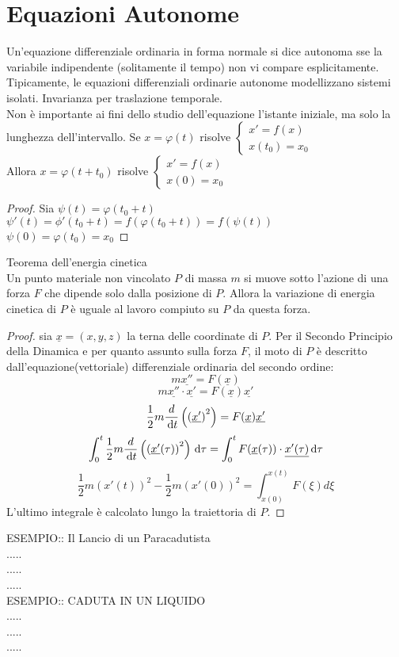 \section{Equazioni Autonome}
Un'equazione differenziale ordinaria in forma normale si dice autonoma sse la variabile indipendente (solitamente il tempo) non vi compare esplicitamente.
\observation
Tipicamente, le equazioni differenziali ordinarie autonome modellizzano sistemi isolati.
\observation Invarianza per traslazione temporale.\\
Non è importante ai fini dello studio dell'equazione l'istante iniziale, ma solo la lunghezza dell'intervallo.
Se  $x=\varphi(t)$ risolve $\left\{ \begin{matrix}  x' = f(x)\\x(t_0)=x_0 \end{matrix} \right.$\\
Allora $x=\varphi(t+t_0)$ risolve $\left\{ \begin{matrix}  x' = f(x)\\x(0)=x_0 \end{matrix} \right.$\\
\begin{proof}
	Sia $\psi(t)=\varphi(t_0+t)$\\
	$ \psi'(t)= \phi'(t_0+t)=f(\varphi(t_0+t))=f(\psi(t))$\\
	$\psi(0)=\varphi(t_0)=x_0$ 
\end{proof}
\proposition Teorema dell'energia cinetica\\
Un punto materiale non vincolato $P$ di massa $m$ si muove sotto l'azione di una forza $F$ che dipende solo dalla posizione di $P$. Allora la variazione di energia cinetica di $P$ è uguale al lavoro compiuto su $P$ da questa forza.
\begin{proof}
	sia $\underline{x}=(x,y,z)$ la terna delle coordinate di $P$. Per il Secondo Principio della Dinamica e per quanto assunto sulla forza $F$, il moto di $P$ è descritto dall'equazione(vettoriale) differenziale ordinaria del secondo ordine:\\
	$$m \underline{x''}=F(\underline{x})$$
	$$m \underline{x''}\cdot \underline{x'}=F(\underline{x}) \underline{x'}$$
	$$\frac{1}{2}m\frac{d}{\,\mathrm{d}{t}}\left(\left( \underline{x'}\right)^2\right)=F(\underline{x}) \underline{x'}$$
	$$\int_{0}^t\frac{1}{2}m\frac{d}{\,\mathrm{d}{t}}\left(\left( \underline{x'}(\tau)\right)^2\right)\,\mathrm{d}{\tau}=\int_{0}^tF(\underline{x}(\tau))\cdot \underline{x'(\tau)}\,\mathrm{d}{\tau}$$
	$$\frac{1}{2}m\left( x'(t)\right)^2-\frac{1}{2}m\left( x'(0)\right)^2 = \int_{x(0)}^{x(t)}F(\xi)d\xi$$
	L'ultimo integrale è calcolato lungo la traiettoria di $P$.
\end{proof}
ESEMPIO:: Il Lancio di un Paracadutista\\
.....\\
.....\\
.....\\
ESEMPIO:: CADUTA IN UN LIQUIDO\\
.....\\
.....\\
.....\\
